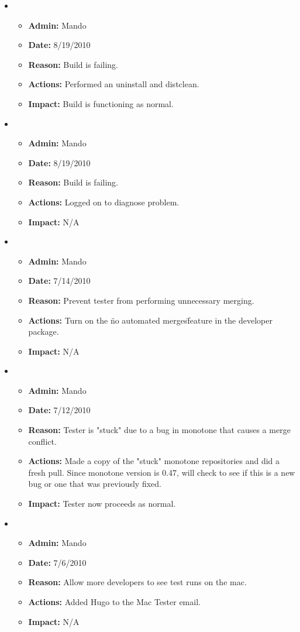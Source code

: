 \documentclass[12pt]{article}
\begin{document}
\begin{itemize}
\item 
\begin{itemize}
\item[] {\bf Admin:} Mando
\item[] {\bf Date:} 8/19/2010
\item[] {\bf Reason:} Build is failing. 
\item[] {\bf Actions:} Performed an uninstall and distclean.
\item[] {\bf Impact:} Build is functioning as normal.
\end{itemize}
	
\item 
\begin{itemize}
\item[] {\bf Admin:} Mando
\item[] {\bf Date:} 8/19/2010
\item[] {\bf Reason:} Build is failing. 
\item[] {\bf Actions:} Logged on to diagnose problem.
\item[] {\bf Impact:} N/A
\end{itemize}
	
\item 
\begin{itemize}
\item[] {\bf Admin:} Mando
\item[] {\bf Date:} 7/14/2010
\item[] {\bf Reason:} Prevent tester from performing unnecessary merging. 
\item[] {\bf Actions:} Turn on the \"no automated merges\" feature in the developer package.
\item[] {\bf Impact:} N/A
\end{itemize}

\item 
\begin{itemize}
\item[] {\bf Admin:} Mando
\item[] {\bf Date:} 7/12/2010
\item[] {\bf Reason:} Tester is "stuck" due to a bug in monotone that causes a merge conflict.
\item[] {\bf Actions:} Made a copy of the "stuck" monotone repositories and did a fresh pull. Since monotone version is 0.47, will check to see if this is a new bug or one that was previously fixed.
\item[] {\bf Impact:} Tester now proceeds as normal. 
\end{itemize}

\item 
\begin{itemize}
\item[] {\bf Admin:} Mando
\item[] {\bf Date:} 7/6/2010
\item[] {\bf Reason:} Allow more developers to see test runs on the mac.
\item[] {\bf Actions:} Added Hugo to the Mac Tester email.
\item[] {\bf Impact:} N/A
\end{itemize}
\end{itemize}
\end{document}
